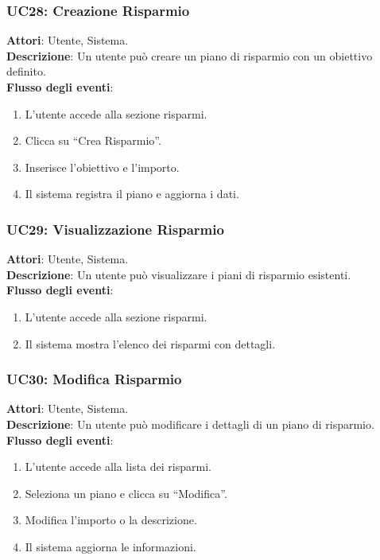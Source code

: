 \subsubsection{UC28: Creazione Risparmio}
\textbf{Attori}: Utente, Sistema. \\
\textbf{Descrizione}: Un utente può creare un piano di risparmio con un obiettivo definito. \\
\textbf{Flusso degli eventi}:
\begin{enumerate}
    \item L’utente accede alla sezione risparmi.
    \item Clicca su ``Crea Risparmio''.
    \item Inserisce l’obiettivo e l’importo.
    \item Il sistema registra il piano e aggiorna i dati.
\end{enumerate}

\subsubsection{UC29: Visualizzazione Risparmio}
\textbf{Attori}: Utente, Sistema. \\
\textbf{Descrizione}: Un utente può visualizzare i piani di risparmio esistenti. \\
\textbf{Flusso degli eventi}:
\begin{enumerate}
    \item L’utente accede alla sezione risparmi.
    \item Il sistema mostra l’elenco dei risparmi con dettagli.
\end{enumerate}

\subsubsection{UC30: Modifica Risparmio}
\textbf{Attori}: Utente, Sistema. \\
\textbf{Descrizione}: Un utente può modificare i dettagli di un piano di risparmio. \\
\textbf{Flusso degli eventi}:
\begin{enumerate}
    \item L’utente accede alla lista dei risparmi.
    \item Seleziona un piano e clicca su ``Modifica''.
    \item Modifica l’importo o la descrizione.
    \item Il sistema aggiorna le informazioni.
\end{enumerate}


